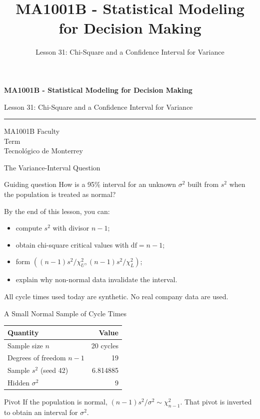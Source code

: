 \documentclass[aspectratio=169,10pt,english]{beamer}
\title{MA1001B - Statistical Modeling for Decision Making}
\subtitle{Lesson 31: Chi-Square and a Confidence Interval for Variance}
\author{}
\institute{Tecnol\'ogico de Monterrey}
\date{}
\begin{document}
\begin{frame}[plain]
  \vspace{1.2cm}
  {\Large\bfseries MA1001B - Statistical Modeling for Decision Making\par}
  \vspace{0.7cm}
  {\large Lesson 31: Chi-Square and a Confidence Interval for Variance\par}
  \vspace{0.7cm}
  {\color{TecRojo}\rule{\textwidth}{1.2pt}}
  \vspace{0.8cm}

  MA1001B Faculty\\[0.3cm]
  Term\\[0.3cm]
  Tecnol\'ogico de Monterrey
\end{frame}

\begin{frame}{The Variance-Interval Question}
  \begin{alertblock}{Guiding question}
    How is a 95\% interval for an unknown $\sigma^{2}$ built from $s^{2}$
    when the population is treated as normal?
  \end{alertblock}

  \vspace{0.6em}
  By the end of this lesson, you can:
  \begin{itemize}
    \item compute $s^{2}$ with divisor $n-1$;
    \item obtain chi-square critical values with $\mathrm{df}=n-1$;
    \item form $((n-1)s^{2}/\chi^{2}_{U},(n-1)s^{2}/\chi^{2}_{L})$;
    \item explain why non-normal data invalidate the interval.
  \end{itemize}

  \vfill
  \scriptsize All cycle times used today are synthetic. No real company data are used.
\end{frame}

\begin{frame}{A Small Normal Sample of Cycle Times}
  \small
  \begin{center}
    \begin{tabular}{lr}
      \toprule
      \textbf{Quantity} & \textbf{Value} \\
      \midrule
      Sample size $n$ & 20 cycles \\
      Degrees of freedom $n-1$ & 19 \\
      Sample $s^{2}$ (seed 42) & 6.814885 \\
      Hidden $\sigma^{2}$ & 9 \\
      \bottomrule
    \end{tabular}
  \end{center}

  \vspace{0.5em}
  \begin{exampleblock}{Pivot}
    If the population is normal, $(n-1)s^{2}/\sigma^{2}\sim\chi^{2}_{n-1}$.
    That pivot is inverted to obtain an interval for $\sigma^{2}$.
  \end{exampleblock}
\end{frame}
\end{document}
